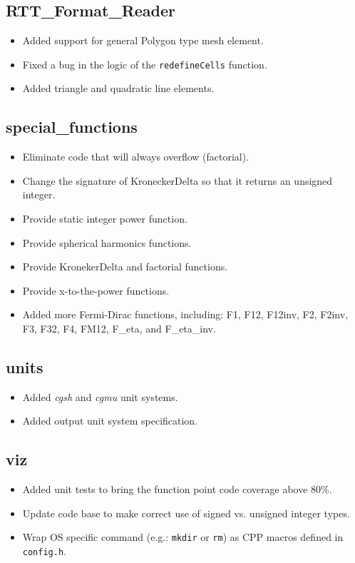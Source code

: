 \documentclass[note]{ResearchNote}
\begin{document}
\subsection{RTT\_Format\_Reader}
\label{changes:RTT-Format-Reader}
\begin{itemize}
\item Added support for general Polygon type mesh element.
\item Fixed a bug in the logic of the \texttt{redefineCells}
  function. 
\item Added triangle and quadratic line elements.
\end{itemize}

\subsection{special\_functions}
\label{changes:special-functions}
\begin{itemize}
\item Eliminate code that will always overflow (factorial).
\item Change the signature of KroneckerDelta so that it returns an
  unsigned integer.
\item Provide static integer power function.
\item Provide spherical harmonics functions.
\item Provide KronekerDelta and factorial functions.
\item Provide x-to-the-power functions.
\item Added more Fermi-Dirac functions, including: F1, F12, F12inv,
  F2, F2inv, F3, F32, F4, FM12, F\_eta, and F\_eta\_inv.
\end{itemize}

\subsection{units}
\label{changes:units}
\begin{itemize}
\item Added {\it cgsh} and {\it cgmu} unit systems.
\item Added output unit system specification.
\end{itemize}

\subsection{viz}
\label{changes:units}
\begin{itemize}
\item Added unit tests to bring the function point code coverage above
  80\%.
\item Update code base to make correct use of signed vs. unsigned
  integer types.
\item Wrap OS specific command (e.g.: \texttt{mkdir} or \texttt{rm})
  as CPP macros defined in \texttt{config.h}.
\end{itemize}
\end{document}
